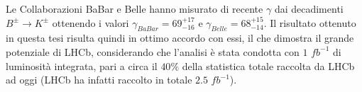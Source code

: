 Le Collaborazioni BaBar\cite{BaBar} e Belle\cite{Belle} hanno misurato di recente $\gamma$ dai decadimenti $B^{\pm}\rightarrow K^{\pm}$ ottenendo i valori
$\gamma_{BaBar} = 69^{+17}_{-16}$ e $ \gamma_{Belle} =  68^{+15}_{-14}$. Il risultato ottenuto in questa tesi risulta quindi in ottimo accordo con essi, il che dimostra 
il grande potenziale di LHCb, considerando che l'analisi è stata condotta con $1$ $fb^{-1}$ di luminosità integrata, pari a circa il $40\%$ della statistica totale raccolta da 
LHCb ad oggi (LHCb ha infatti raccolto in totale $2.5$ $fb^{-1}$).


